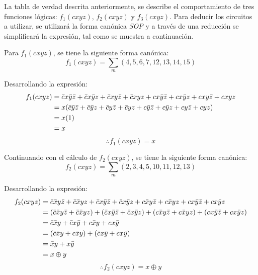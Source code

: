 \documentclass[../procedimientos.tex]{subfiles}
\begin{document}
La tabla de verdad descrita anteriormente, se describe el comportamiento de 
tres funciones lógicas: $f_1(cxyz)$, $f_2(cxyz)$ y $f_3(cxyz)$. Para deducir 
los circuitos a utilizar, se utilizará la forma canónica \textit{SOP} y a 
través de una reducción se simplificará la expresión, tal como se muestra a 
continuación.

Para $f_1(cxyz)$, se tiene la siguiente forma canónica:
\begin{equation*}
  f_1(cxyz) = \sum_m (4, 5, 6, 7, 12, 13, 14, 15)
\end{equation*}

Desarrollando la expresión:
\begin{align*}
  f_1(cxyz) &= \bar{c}x\bar{y}\bar{z} + \bar{c}x\bar{y}z + \bar{c}xy\bar{z} + 
  \bar{c}xyz + cx\bar{y}\bar{z} + cx\bar{y}z + cxy\bar{z} + cxyz\\
  &= x(\bar{c}\bar{y}\bar{z} + \bar{c}\bar{y}z + \bar{c}y\bar{z} + \bar{c}yz + 
  c\bar{y}\bar{z} + c\bar{y}z + cy\bar{z} + cyz)\\
  &= x(1)\\
  &= x
\end{align*}
\begin{equation*}
  \boxed{
    \therefore f_1(cxyz) = x
  }
\end{equation*}

Continuando con el cálculo de $f_2(cxyz)$, se tiene la siguiente forma 
canónica:
\begin{equation*}
  f_2(cxyz) = \sum_m (2, 3, 4, 5, 10, 11, 12, 13)
\end{equation*}

Desarrollando la expresión:
\begin{align*}
  f_2(cxyz) &= \bar{c}\bar{x}y\bar{z} + \bar{c}\bar{x}yz + \bar{c}x\bar{y}\bar{z} + 
  \bar{c}x\bar{y}z + c\bar{x}y\bar{z} + c\bar{x}yz + cx\bar{y}\bar{z} + cx\bar{y}z\\
  &= (\bar{c}\bar{x}y\bar{z} + \bar{c}\bar{x}yz) + (\bar{c}x\bar{y}\bar{z} + 
  \bar{c}x\bar{y}z) + (c\bar{x}y\bar{z} + c\bar{x}yz) + (cx\bar{y}\bar{z} + 
  cx\bar{y}z)\\
  &= \bar{c}\bar{x}y + \bar{c}x\bar{y} + c\bar{x}y + cx\bar{y}\\
  &= (\bar{c}\bar{x}y + c\bar{x}y) + (\bar{c}x\bar{y} + cx\bar{y})\\
  &= \bar{x}y + x\bar{y}\\
  &= x \oplus y
\end{align*}
\begin{equation*}
  \boxed{
    \therefore f_2(cxyz) = x \oplus y
  }
\end{equation*}
\end{document}
